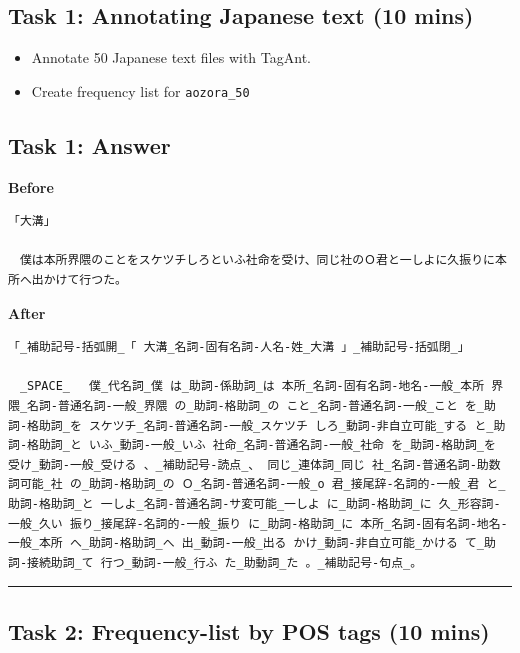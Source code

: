 \documentclass[
  english,
  11pt,
]{article}
\providecommand{\tightlist}{%
  \setlength{\itemsep}{0pt}\setlength{\parskip}{0pt}}
\begin{document}
\subsection{Task 1: Annotating Japanese text (10
mins)}\label{task-1-annotating-japanese-text-10-mins}

\begin{itemize}
\tightlist
\item
  Annotate 50 Japanese text files with TagAnt.
\item
  Create frequency list for \texttt{aozora\_50}
\end{itemize}

\subsection{Task 1: Answer}\label{task-1-answer}

\textbf{Before}

\begin{verbatim}
「大溝」

　僕は本所界隈のことをスケツチしろといふ社命を受け、同じ社のＯ君と一しよに久振りに本所へ出かけて行つた。
\end{verbatim}

\textbf{After}

\begin{verbatim}
「_補助記号-括弧開_「 大溝_名詞-固有名詞-人名-姓_大溝 」_補助記号-括弧閉_」

　_SPACE_　 僕_代名詞_僕 は_助詞-係助詞_は 本所_名詞-固有名詞-地名-一般_本所 界隈_名詞-普通名詞-一般_界隈 の_助詞-格助詞_の こと_名詞-普通名詞-一般_こと を_助詞-格助詞_を スケツチ_名詞-普通名詞-一般_スケツチ しろ_動詞-非自立可能_する と_助詞-格助詞_と いふ_動詞-一般_いふ 社命_名詞-普通名詞-一般_社命 を_助詞-格助詞_を 受け_動詞-一般_受ける 、_補助記号-読点_、 同じ_連体詞_同じ 社_名詞-普通名詞-助数詞可能_社 の_助詞-格助詞_の Ｏ_名詞-普通名詞-一般_o 君_接尾辞-名詞的-一般_君 と_助詞-格助詞_と 一しよ_名詞-普通名詞-サ変可能_一しよ に_助詞-格助詞_に 久_形容詞-一般_久い 振り_接尾辞-名詞的-一般_振り に_助詞-格助詞_に 本所_名詞-固有名詞-地名-一般_本所 へ_助詞-格助詞_へ 出_動詞-一般_出る かけ_動詞-非自立可能_かける て_助詞-接続助詞_て 行つ_動詞-一般_行ふ た_助動詞_た 。_補助記号-句点_。
\end{verbatim}

\begin{center}\rule{0.5\linewidth}{0.5pt}\end{center}

\subsection{Task 2: Frequency-list by POS tags (10
mins)}\label{task-2-frequency-list-by-pos-tags-10-mins}
\end{document}
